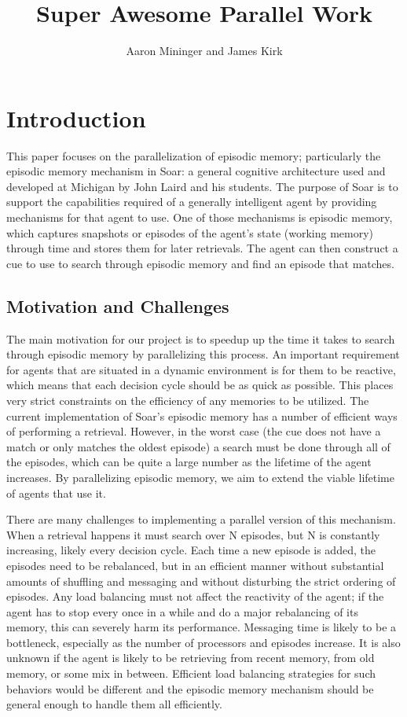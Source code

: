 \documentclass[11pt]{article} %
\title{Super Awesome Parallel Work}
\author{Aaron Mininger and James Kirk}
\begin{document}
\maketitle

\section{Introduction}
This paper focuses on the parallelization of episodic memory; particularly the
episodic memory mechanism in Soar: a general cognitive architecture used and
developed at Michigan by John Laird and his students. The purpose of Soar is to
support the capabilities required of a generally intelligent agent by providing
mechanisms for that agent to use. One of those mechanisms is episodic memory,
which captures snapshots or episodes of the agent’s state (working memory)
through time and stores them for later retrievals. The agent can then construct
a cue to use to search through episodic memory and find an episode that matches.

\subsection{Motivation and Challenges}
The main motivation for our project is to speedup up the time it takes to search 
through episodic memory by parallelizing this process. An important requirement
for agents that are situated in a dynamic environment is for them to be reactive, 
which means that each decision cycle
should be as quick as possible. This places very strict constraints on the
efficiency of any memories to be utilized. The current implementation of Soar’s
episodic memory has a number of efficient ways of performing a retrieval. However,
in the worst case (the cue does not have a match or only matches the oldest
episode) a search must be done through all of the episodes, which can be quite a
large number as the lifetime of the agent increases. By parallelizing episodic memory,
we aim to extend the viable lifetime of agents that use it. 
 
There are many challenges to implementing a parallel version of this mechanism.
 When a retrieval happens it must search over N episodes, but N is constantly 
increasing, likely every decision cycle. Each time a new episode is added, the 
episodes need to be rebalanced, but in an efficient manner without substantial 
amounts of shuffling and messaging and without disturbing the strict ordering
 of episodes. Any load balancing must not affect the reactivity of the agent; if 
the agent has to stop every once in a while and do a major rebalancing of 
its memory, this can severely harm its performance. 
Messaging time is likely to be a bottleneck, especially as the 
number of processors and episodes increase. It is also unknown if the agent is 
likely to be retrieving from recent memory, from old memory, or some mix in 
between.  Efficient load balancing strategies for such behaviors would be 
different and the episodic memory mechanism should be general enough to handle 
them all efficiently.
\end{document}
